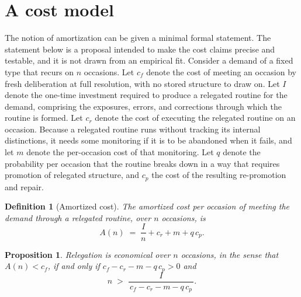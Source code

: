 \documentclass[11pt]{report}
\newtheorem{definition}{Definition}[chapter]
\newtheorem{proposition}{Proposition}[chapter]
\theoremstyle{remark}
\theoremstyle{definition}
\begin{document}
\section{A cost model}

The notion of amortization can be given a minimal formal statement. The statement below is a proposal intended to make the cost claims precise and testable, and it is not drawn from an empirical fit. Consider a demand of a fixed type that recurs on $n$ occasions. Let $c_f$ denote the cost of meeting an occasion by fresh deliberation at full resolution, with no stored structure to draw on. Let $I$ denote the one-time investment required to produce a relegated routine for the demand, comprising the exposures, errors, and corrections through which the routine is formed. Let $c_r$ denote the cost of executing the relegated routine on an occasion. Because a relegated routine runs without tracking its internal distinctions, it needs some monitoring if it is to be abandoned when it fails, and let $m$ denote the per-occasion cost of that monitoring. Let $q$ denote the probability per occasion that the routine breaks down in a way that requires promotion of relegated structure, and $c_p$ the cost of the resulting re-promotion and repair.

\begin{definition}[Amortized cost]
The amortized cost per occasion of meeting the demand through a relegated routine, over $n$ occasions, is
\[
A(n) \;=\; \frac{I}{n} + c_r + m + q\,c_p .
\]
\end{definition}

\begin{proposition}
Relegation is economical over $n$ occasions, in the sense that $A(n) < c_f$, if and only if $c_f - c_r - m - q\,c_p > 0$ and
\[
n \;>\; \frac{I}{\,c_f - c_r - m - q\,c_p\,}.
\]
\end{proposition}
\end{document}
